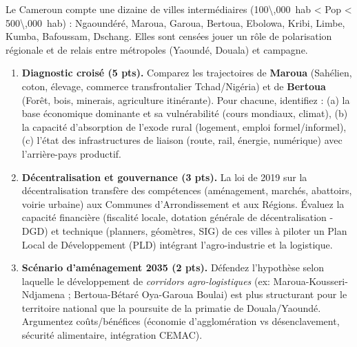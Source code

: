 \documentclass[11pt]{article}
\begin{document}
\begin{exercice}
\label{exo:synthese}
Le Cameroun compte une dizaine de villes intermédiaires (\SI{100\,000}{hab} < Pop < \SI{500\,000}{hab}) : Ngaoundéré, Maroua, Garoua, Bertoua, Ebolowa, Kribi, Limbe, Kumba, Bafoussam, Dschang. Elles sont censées jouer un rôle de polarisation régionale et de relais entre métropoles (Yaoundé, Douala) et campagne.
\begin{enumerate}
    \item \textbf{Diagnostic croisé (5 pts).} Comparez les trajectoires de \textbf{Maroua} (Sahélien, coton, élevage, commerce transfrontalier Tchad/Nigéria) et de \textbf{Bertoua} (Forêt, bois, minerais, agriculture itinérante). Pour chacune, identifiez : (a) la base économique dominante et sa vulnérabilité (cours mondiaux, climat), (b) la capacité d'absorption de l'exode rural (logement, emploi formel/informel), (c) l'état des infrastructures de liaison (route, rail, énergie, numérique) avec l'arrière-pays productif.
    \item \textbf{Décentralisation et gouvernance (3 pts).} La loi de 2019 sur la décentralisation transfère des compétences (aménagement, marchés, abattoirs, voirie urbaine) aux Communes d'Arrondissement et aux Régions. Évaluez la capacité financière (fiscalité locale, dotation générale de décentralisation - DGD) et technique (planners, géomètres, SIG) de ces villes à piloter un Plan Local de Développement (PLD) intégrant l'agro-industrie et la logistique.
    \item \textbf{Scénario d'aménagement 2035 (2 pts).} Défendez l'hypothèse selon laquelle le développement de \textit{corridors agro-logistiques} (ex: Maroua-Kousseri-Ndjamena ; Bertoua-Bétaré Oya-Garoua Boulai) est plus structurant pour le territoire national que la poursuite de la primatie de Douala/Yaoundé. Argumentez coûts/bénéfices (économie d'agglomération vs désenclavement, sécurité alimentaire, intégration CEMAC).
\end{enumerate}
\end{exercice}
\end{document}
